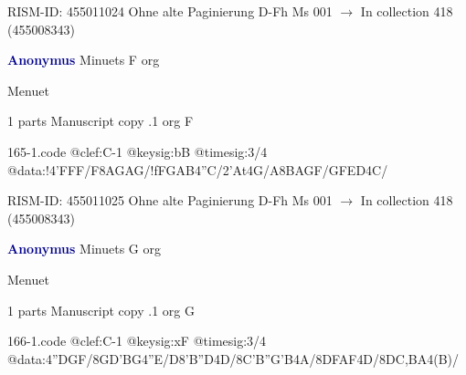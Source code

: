 \documentclass[twocolumn]{book}
\begin{document}
\newline RISM-ID: 455011024
\newline Ohne alte Paginierung
\newline D-Fh  Ms 001
\newline $\rightarrow$ In collection 418 (455008343)

\newline \par \vspace{7pt} \textcolor{darkblue}{\textbf{Anonymus  }}
\newline Minuets  F  
\newline org
\newline \begin{itshape}[f.117r, heading:] Menuet\end{itshape} 
\newline \textcolor{darkblue}{}  1 parts  
\newline Manuscript copy
.1  org  F  
\begin{filecontents*}{165-1.code}
@clef:C-1
@keysig:bB
@timesig:3/4
@data:!4'FFF/F{8AGAG}/!f{FGAB}4''C/2'At4G/A{8BAGF}/{GFED}4C/
\end{filecontents*}
\newline
%

\newline RISM-ID: 455011025
\newline Ohne alte Paginierung
\newline D-Fh  Ms 001
\newline $\rightarrow$ In collection 418 (455008343)

\newline \par \vspace{7pt} \textcolor{darkblue}{\textbf{Anonymus  }}
\newline Minuets  G  
\newline org
\newline \begin{itshape}[f.118r, heading:] Menuet\end{itshape} 
\newline \textcolor{darkblue}{}  1 parts  
\newline Manuscript copy
.1  org  G  
\begin{filecontents*}{166-1.code}
@clef:C-1
@keysig:xF
@timesig:3/4
@data:4''DGF/{8GD'BG}4''E/D{8'B''D}4D/{8C'B''G'B}4A/{8DF}{AF}4D/{8DC,BA}4(B)/
\end{filecontents*}
\newline
%
\end{document}
